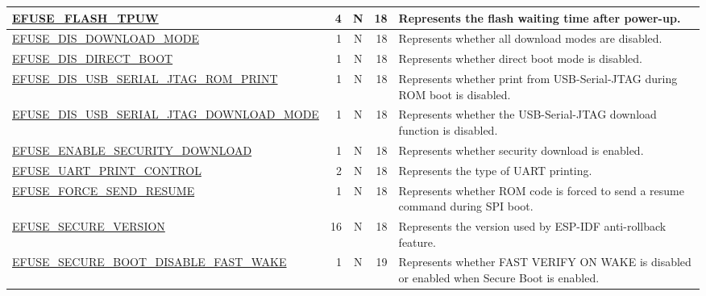 \begin{longtable}[l]{ |m{8.2cm}|r|c|r|m{9cm}| }
    \hline
    \hyperref[fielddesc:EFUSEFLASHTPUW]{EFUSE\_FLASH\_TPUW} & 4 & N & 18 & Represents the flash waiting time after power-up.\\
    \hline    
    \hyperref[fielddesc:EFUSEDISDOWNLOADMODE]{EFUSE\_DIS\_DOWNLOAD\_MODE} & 1 & N & 18 & Represents whether all download modes are disabled.\\ 
    \hline
    \hyperref[fielddesc:EFUSEDISDIRECTBOOT]{EFUSE\_DIS\_DIRECT\_BOOT} & 1 & N & 18 & Represents whether direct boot mode is disabled.\\
    \hline
    \hyperref[fielddesc:EFUSEDISUSBSERIALJTAGROMPRINT]{EFUSE\_DIS\_USB\_SERIAL\_JTAG\_ROM\_PRINT} & 1 & N & 18 & Represents whether print from USB-Serial-JTAG during ROM boot is disabled.\\
    \hline 
    \hyperref[fielddesc:EFUSEDISUSBSERIALJTAGDOWNLOADMODE]{EFUSE\_DIS\_USB\_SERIAL\_JTAG\_DOWNLOAD\_MODE} & 1 & N & 18 & Represents whether the USB-Serial-JTAG download function is disabled. \\
    \hline 
    \hyperref[fielddesc:EFUSEENABLESECURITYDOWNLOAD]{EFUSE\_ENABLE\_SECURITY\_DOWNLOAD} & 1 & N & 18 & Represents whether security download is enabled. \\
    \hline
    \hyperref[fielddesc:EFUSEUARTPRINTCONTROL]{EFUSE\_UART\_PRINT\_CONTROL} & 2 & N & 18 & Represents the type of UART printing.\\
    \hline
    \hyperref[fielddesc:EFUSEFORCESENDRESUME]{EFUSE\_FORCE\_SEND\_RESUME} & 1 & N & 18 & Represents whether ROM code is forced to send a resume command during SPI boot. \\  
    \hline
    \hyperref[fielddesc:EFUSESECUREVERSION]{EFUSE\_SECURE\_VERSION} & 16 & N & 18 & Represents the version used by ESP-IDF anti-rollback feature. \\\hline
    \hyperref[fielddesc:EFUSESECUREBOOTDISABLEFASTWAKE]{EFUSE\_SECURE\_BOOT\_DISABLE\_FAST\_WAKE} & 1 & N & 19 & Represents whether FAST VERIFY ON WAKE is disabled or enabled when Secure Boot is enabled.\\\hline    
\end{longtable}
